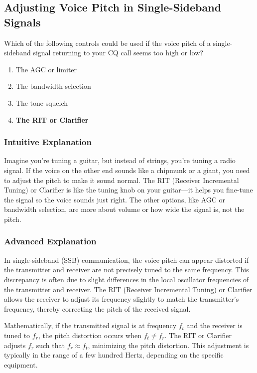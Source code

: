 \subsection{Adjusting Voice Pitch in Single-Sideband Signals}
\label{T4B06}

\begin{tcolorbox}[colback=gray!10!white,colframe=black!75!black,title=T4B06]
Which of the following controls could be used if the voice pitch of a single-sideband signal returning to your CQ call seems too high or low?
\begin{enumerate}[label=\Alph*)]
    \item The AGC or limiter
    \item The bandwidth selection
    \item The tone squelch
    \item \textbf{The RIT or Clarifier}
\end{enumerate}
\end{tcolorbox}

\subsubsection{Intuitive Explanation}
Imagine you’re tuning a guitar, but instead of strings, you’re tuning a radio signal. If the voice on the other end sounds like a chipmunk or a giant, you need to adjust the pitch to make it sound normal. The RIT (Receiver Incremental Tuning) or Clarifier is like the tuning knob on your guitar—it helps you fine-tune the signal so the voice sounds just right. The other options, like AGC or bandwidth selection, are more about volume or how wide the signal is, not the pitch.

\subsubsection{Advanced Explanation}
In single-sideband (SSB) communication, the voice pitch can appear distorted if the transmitter and receiver are not precisely tuned to the same frequency. This discrepancy is often due to slight differences in the local oscillator frequencies of the transmitter and receiver. The RIT (Receiver Incremental Tuning) or Clarifier allows the receiver to adjust its frequency slightly to match the transmitter's frequency, thereby correcting the pitch of the received signal.

Mathematically, if the transmitted signal is at frequency \( f_t \) and the receiver is tuned to \( f_r \), the pitch distortion occurs when \( f_t \neq f_r \). The RIT or Clarifier adjusts \( f_r \) such that \( f_r \approx f_t \), minimizing the pitch distortion. This adjustment is typically in the range of a few hundred Hertz, depending on the specific equipment.

